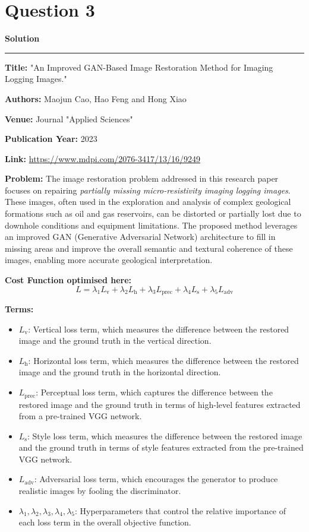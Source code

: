 \documentclass[a4paper,12pt]{article}
\title{\cooltitle{CS663 Assignment-5}}
\author{{\bf Saksham Rathi, Kavya Gupta, Shravan Srinivasa Raghavan} \\
\small Department of Computer Science, \\
Indian Institute of Technology Bombay \\}
\date{}
\newenvironment{solution}[2][]{%
    \begin{mdframed}[linecolor=blue!70!black, linewidth=2pt, roundcorner=10pt, backgroundcolor=yellow!10!white, skipabove=12pt, skipbelow=12pt]%
        \textbf{\large #2}
        \par\noindent\rule{\textwidth}{0.4pt}
}{
    \end{mdframed}
}
\begin{document}
\maketitle

\section*{Question 3}
\begin{solution}{Solution}
	\textbf{Title:} "An Improved GAN-Based Image Restoration Method for Imaging Logging Images."

	\textbf{Authors:} Maojun Cao, Hao Feng and Hong Xiao

	\textbf{Venue:} Journal "Applied Sciences"

	\textbf{Publication Year:} 2023

	\textbf{Link:} \url{https://www.mdpi.com/2076-3417/13/16/9249}

	\textbf{Problem:} The image restoration problem addressed in this research paper focuses on repairing \textit{partially missing micro-resistivity imaging logging images}. These images, often used in the exploration and analysis of complex geological formations such as oil and gas reservoirs, can be distorted or partially lost due to downhole conditions and equipment limitations. The proposed method leverages an improved GAN (Generative Adversarial Network) architecture to fill in missing areas and improve the overall semantic and textural coherence of these images, enabling more accurate geological interpretation.

	\textbf{Cost Function optimised here:}
	\[
		L = \lambda_{1}L_{\text{v}} + \lambda_{2}L_{\text{h}} + \lambda_{3}L_{\text{prec}} + \lambda_{4}L_{\text{s}} + \lambda_{5}L_{\text{adv}}
	\]

	\textbf{Terms:}
	\begin{itemize}
		\item $L_{\text{v}}$: Vertical loss term, which measures the difference between the restored image and the ground truth in the vertical direction.
		\item $L_{\text{h}}$: Horizontal loss term, which measures the difference between the restored image and the ground truth in the horizontal direction.
		\item $L_{\text{prec}}$: Perceptual loss term, which captures the difference between the restored image and the ground truth in terms of high-level features extracted from a pre-trained VGG network.
		\item $L_{\text{s}}$: Style loss term, which measures the difference between the restored image and the ground truth in terms of style features extracted from the pre-trained VGG network.
		\item $L_{\text{adv}}$: Adversarial loss term, which encourages the generator to produce realistic images by fooling the discriminator.
		\item $\lambda_{1}, \lambda_{2}, \lambda_{3}, \lambda_{4}, \lambda_{5}$: Hyperparameters that control the relative importance of each loss term in the overall objective function.
	\end{itemize}
\end{solution}
\end{document}
